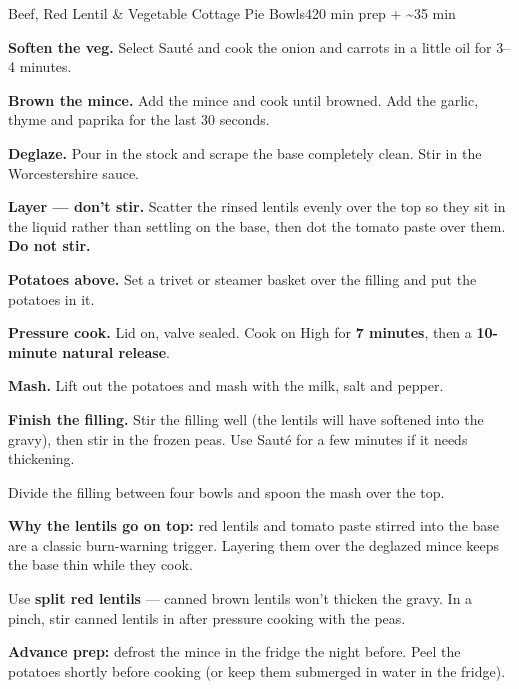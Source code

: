\begin{recipebox}{Beef, Red Lentil \& Vegetable Cottage Pie Bowls}{4}{20 min prep + \textasciitilde35 min}
\begin{method}
  \item \textbf{Soften the veg.} Select Saut\'e and cook the onion and carrots in a little oil for 3--4 minutes.
  \item \textbf{Brown the mince.} Add the mince and cook until browned. Add the garlic, thyme and paprika for the last 30 seconds.
  \item \textbf{Deglaze.} Pour in the stock and scrape the base completely clean. Stir in the Worcestershire sauce.
  \item \textbf{Layer --- don't stir.} Scatter the rinsed lentils evenly over the top so they sit in the liquid rather than settling on the base, then dot the tomato paste over them. \textbf{Do not stir.}
  \item \textbf{Potatoes above.} Set a trivet or steamer basket over the filling and put the potatoes in it.
  \item \textbf{Pressure cook.} Lid on, valve sealed. Cook on High for \textbf{7 minutes}, then a \textbf{10-minute natural release}.
  \item \textbf{Mash.} Lift out the potatoes and mash with the milk, salt and pepper.
  \item \textbf{Finish the filling.} Stir the filling well (the lentils will have softened into the gravy), then stir in the frozen peas. Use Saut\'e for a few minutes if it needs thickening.
  \item Divide the filling between four bowls and spoon the mash over the top.
\end{method}

\begin{notelist}
  \item \textbf{Why the lentils go on top:} red lentils and tomato paste stirred into the base are a classic burn-warning trigger. Layering them over the deglazed mince keeps the base thin while they cook.
  \item Use \textbf{split red lentils} --- canned brown lentils won't thicken the gravy. In a pinch, stir canned lentils in after pressure cooking with the peas.
  \item \textbf{Advance prep:} defrost the mince in the fridge the night before. Peel the potatoes shortly before cooking (or keep them submerged in water in the fridge).
\end{notelist}

\end{recipebox}
